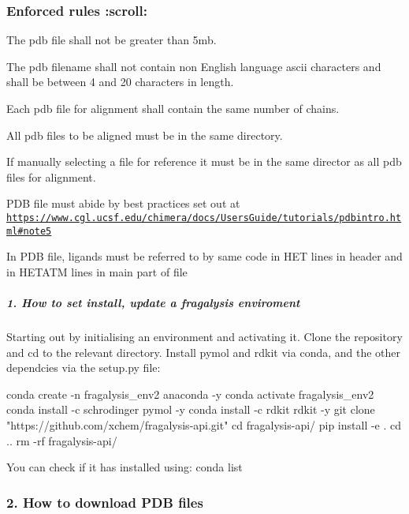 \subsubsection*{Enforced rules \+:scroll\+:}


\begin{DoxyItemize}
\item The pdb file shall not be greater than 5mb.
\item The pdb filename shall not contain non English language ascii characters and shall be between 4 and 20 characters in length.
\item Each pdb file for alignment shall contain the same number of chains.
\item All pdb files to be aligned must be in the same directory.
\item If manually selecting a file for reference it must be in the same director as all pdb files for alignment.
\item P\+DB file must abide by best practices set out at \href{https://www.cgl.ucsf.edu/chimera/docs/UsersGuide/tutorials/pdbintro.html#note5}{\tt https\+://www.\+cgl.\+ucsf.\+edu/chimera/docs/\+Users\+Guide/tutorials/pdbintro.\+html\#note5}
\item In P\+DB file, ligands must be referred to by same code in \textquotesingle{}H\+ET\textquotesingle{} lines in header and in \textquotesingle{}H\+E\+T\+A\+TM\textquotesingle{} lines in main part of file
\end{DoxyItemize}

\subparagraph*{1. How to set install, update a fragalysis enviroment}

Starting out by initialising an environment and activating it. Clone the repository and cd to the relevant directory. Install pymol and rdkit via conda, and the other dependcies via the setup.\+py file\+:


\begin{DoxyCode}
conda create -n fragalysis\_env2 anaconda -y
conda activate fragalysis\_env2
conda install -c schrodinger pymol -y
conda install -c rdkit rdkit -y
git clone "https://github.com/xchem/fragalysis-api.git"
cd fragalysis-api/
pip install -e .
cd ..
rm -rf fragalysis-api/
\end{DoxyCode}


You can check if it has installed using\+: {\ttfamily conda list}

\subsubsection*{2. How to download P\+DB files}

